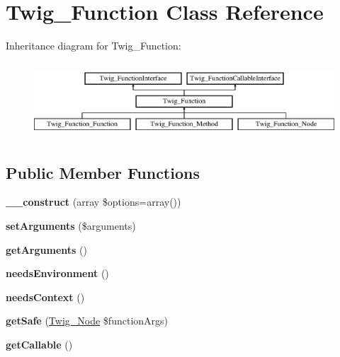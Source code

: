 \hypertarget{class_twig___function}{}\section{Twig\+\_\+\+Function Class Reference}
\label{class_twig___function}
Inheritance diagram for Twig\+\_\+\+Function\+:\begin{figure}[H]
\begin{center}
\leavevmode
\includegraphics[height=2.828283cm]{class_twig___function}
\end{center}
\end{figure}
\subsection*{Public Member Functions}
\begin{DoxyCompactItemize}
\item 
\hypertarget{class_twig___function_a2d2b2afcd896367c740d1eb4b486614b}{}{\bfseries \+\_\+\+\_\+construct} (array \$options=array())\label{class_twig___function_a2d2b2afcd896367c740d1eb4b486614b}

\item 
\hypertarget{class_twig___function_a2b7df0e0f61ee886144db2d59fc0d7da}{}{\bfseries set\+Arguments} (\$arguments)\label{class_twig___function_a2b7df0e0f61ee886144db2d59fc0d7da}

\item 
\hypertarget{class_twig___function_a1d4c324c5a088be98d99d3efbf3502e1}{}{\bfseries get\+Arguments} ()\label{class_twig___function_a1d4c324c5a088be98d99d3efbf3502e1}

\item 
\hypertarget{class_twig___function_a711311882c7dd1058f92f7eb0e8edeeb}{}{\bfseries needs\+Environment} ()\label{class_twig___function_a711311882c7dd1058f92f7eb0e8edeeb}

\item 
\hypertarget{class_twig___function_a52c35bc6da8861f40aa59f1b99f7ef0f}{}{\bfseries needs\+Context} ()\label{class_twig___function_a52c35bc6da8861f40aa59f1b99f7ef0f}

\item 
\hypertarget{class_twig___function_afe45269f2b6ea19ab9503c02ec865655}{}{\bfseries get\+Safe} (\hyperlink{class_twig___node}{Twig\+\_\+\+Node} \$function\+Args)\label{class_twig___function_afe45269f2b6ea19ab9503c02ec865655}

\item 
\hypertarget{class_twig___function_a0be839e0782a38a172c386bd963375c9}{}{\bfseries get\+Callable} ()\label{class_twig___function_a0be839e0782a38a172c386bd963375c9}

\end{DoxyCompactItemize}

